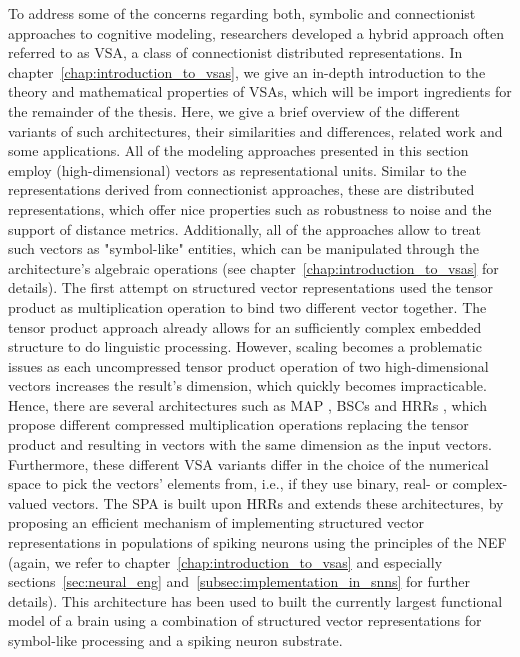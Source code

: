 To address some of the concerns regarding both, symbolic and connectionist approaches to cognitive modeling, researchers developed a hybrid approach often referred to as \acf{VSA}, a class of connectionist distributed representations.
In chapter~\ref{chap:introduction_to_vsas}, we give an in-depth introduction to the theory and mathematical properties of \acp{VSA}, which will be import ingredients for the remainder of the thesis.
Here, we give a brief overview of the different variants of such architectures, their similarities and differences, related work and some applications.
All of the modeling approaches presented in this section employ (high-dimensional) vectors as representational units.
Similar to the representations derived from connectionist approaches, these are distributed representations, which offer nice properties such as robustness to noise and the support of distance metrics.
Additionally, all of the approaches allow to treat such vectors as "symbol-like" entities, which can be manipulated through the architecture's algebraic operations (see chapter~\ref{chap:introduction_to_vsas} for details).
The first attempt on structured vector representations used the tensor product as multiplication operation \cite{Smolensky1990} to bind two different vector together.
The tensor product approach already allows for an sufficiently complex embedded structure to do linguistic processing.
However, scaling becomes a problematic issues as each uncompressed tensor product operation of two high-dimensional vectors increases the result's dimension, which quickly becomes impracticable.
Hence, there are several architectures such as \ac{MAP} \cite{Gayler1998, Gayler2003}, \acp{BSC} \cite{Kanerva1988} and \acp{HRR} \cite{Plate1991, Plate1994}, which propose different compressed multiplication operations replacing the tensor product and resulting in vectors with the same dimension as the input vectors.
Furthermore, these different \ac{VSA} variants differ in the choice of the numerical space to pick the vectors' elements from, i.e., if they use binary, real- or complex-valued vectors. 
The \ac{SPA} \cite{Eliasmith2013} is built upon \acp{HRR} and extends these architectures, by proposing an efficient mechanism of implementing structured vector representations in populations of spiking neurons using the principles of the \ac{NEF} \cite{Eliasmith2003} (again, we refer to chapter~\ref{chap:introduction_to_vsas} and especially sections~\ref{sec:neural_eng} and~\ref{subsec:implementation_in_snns} for further details).   
This architecture has been used to built the currently largest functional model of a brain \cite{Eliasmith2012} using a combination of structured vector representations for symbol-like processing and a spiking neuron substrate.

